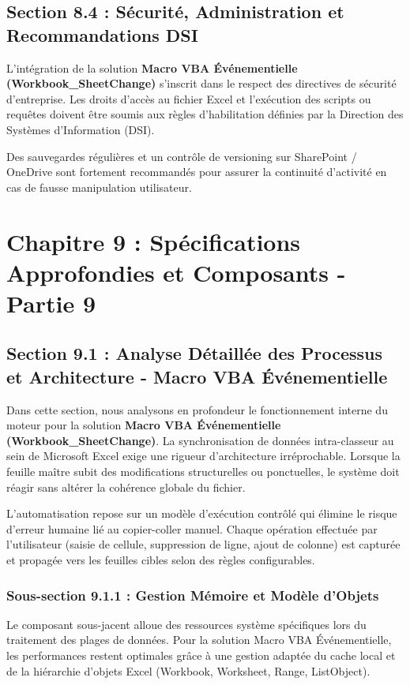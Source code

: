 \documentclass[12pt,a4paper]{report}
\begin{document}
\section{Section 8.4 : Sécurité, Administration et Recommandations DSI}
L'intégration de la solution \textbf{Macro VBA Événementielle (Workbook\_SheetChange)} s'inscrit dans le respect des directives de sécurité d'entreprise. Les droits d'accès au fichier Excel et l'exécution des scripts ou requêtes doivent être soumis aux règles d'habilitation définies par la Direction des Systèmes d'Information (DSI).

Des sauvegardes régulières et un contrôle de versioning sur SharePoint / OneDrive sont fortement recommandés pour assurer la continuité d'activité en cas de fausse manipulation utilisateur.


\chapter{Chapitre 9 : Spécifications Approfondies et Composants - Partie 9}

\section{Section 9.1 : Analyse Détaillée des Processus et Architecture - Macro VBA Événementielle}
Dans cette section, nous analysons en profondeur le fonctionnement interne du moteur pour la solution \textbf{Macro VBA Événementielle (Workbook\_SheetChange)}. La synchronisation de données intra-classeur au sein de Microsoft Excel exige une rigueur d'architecture irréprochable. Lorsque la feuille maître subit des modifications structurelles ou ponctuelles, le système doit réagir sans altérer la cohérence globale du fichier.

L'automatisation repose sur un modèle d'exécution contrôlé qui élimine le risque d'erreur humaine lié au copier-coller manuel. Chaque opération effectuée par l'utilisateur (saisie de cellule, suppression de ligne, ajout de colonne) est capturée et propagée vers les feuilles cibles selon des règles configurables.


\subsection{Sous-section 9.1.1 : Gestion Mémoire et Modèle d'Objets}
Le composant sous-jacent alloue des ressources système spécifiques lors du traitement des plages de données. Pour la solution Macro VBA Événementielle, les performances restent optimales grâce à une gestion adaptée du cache local et de la hiérarchie d'objets Excel (Workbook, Worksheet, Range, ListObject).
\end{document}
